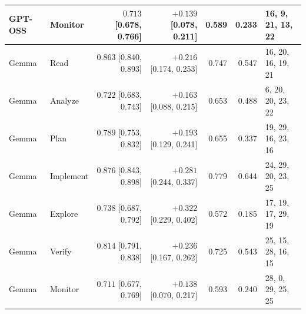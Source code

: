 \begin{table}[tbp]
{\begin{tabular}{llrrrrl}
GPT-OSS & Monitor & $0.713$ [0.678, 0.766] & $+0.139$ [0.078, 0.211] & 0.589 & 0.233 & 16, 9, 21, 13, 22 \\
\midrule
Gemma & Read & $0.863$ [0.840, 0.893] & $+0.216$ [0.174, 0.253] & 0.747 & 0.547 & 16, 20, 16, 19, 21 \\
Gemma & Analyze & $0.722$ [0.683, 0.743] & $+0.163$ [0.088, 0.215] & 0.653 & 0.488 & 6, 20, 20, 23, 22 \\
Gemma & Plan & $0.789$ [0.753, 0.832] & $+0.193$ [0.129, 0.241] & 0.655 & 0.337 & 19, 29, 16, 23, 16 \\
Gemma & Implement & $0.876$ [0.843, 0.898] & $+0.281$ [0.244, 0.337] & 0.779 & 0.644 & 24, 29, 20, 23, 25 \\
Gemma & Explore & $0.738$ [0.687, 0.792] & $+0.322$ [0.229, 0.402] & 0.572 & 0.185 & 17, 19, 17, 29, 19 \\
Gemma & Verify & $0.814$ [0.791, 0.838] & $+0.236$ [0.167, 0.262] & 0.725 & 0.543 & 25, 15, 28, 16, 15 \\
Gemma & Monitor & $0.711$ [0.677, 0.769] & $+0.138$ [0.070, 0.217] & 0.593 & 0.240 & 28, 0, 29, 25, 25 \\
\bottomrule
\end{tabular}}
\end{table}
